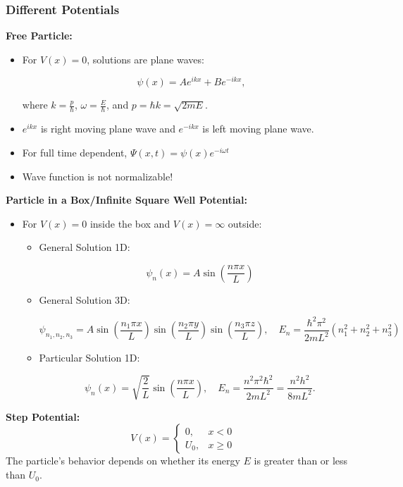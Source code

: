 \documentclass{article}
\newcommand{\eqbox}[1]{\begin{tcolorbox}[colback=gray!10] #1 \end{tcolorbox}}
\newcommand{\conceptbox}[1]{\begin{tcolorbox}[colback=blue!10] #1 \end{tcolorbox}}
\begin{document}
\subsubsection{Different Potentials}
\conceptbox{
\textbf{Free Particle:}
\begin{itemize}
    \item For \( V(x) = 0 \), solutions are plane waves:
    \eqbox{
    \[
    \psi(x) = Ae^{ikx} + Be^{-ikx},
    \]}
    where \( k = \frac{p}{\hbar} \), \( \omega = \frac{E}{\hbar} \), and \(p = \hbar k = \sqrt{2mE}\).
    \item \(e^{ikx}\) is right moving plane wave and \(e^{-ikx}\) is left moving plane wave.
    \item For full time dependent, \(\Psi(x,t) = \psi(x)e^{-i\omega t}\)
    \item Wave function is not normalizable!
\end{itemize}
}

\conceptbox{
\textbf{Particle in a Box/Infinite Square Well Potential:}
\begin{itemize}
    \item For \( V(x) = 0 \) inside the box and \( V(x) = \infty \) outside:
    \begin{itemize}
        \item General Solution 1D:
            \eqbox{
                \[
                    \psi_n(x) = A\sin\left(\frac{n\pi x}{L}\right)
                \]
            }
        \item General Solution 3D:
            \eqbox{
                \[
                \psi_{n_1, n_2, n_3} = A\sin(\frac{n_1 \pi x}{L})\sin(\frac{n_2 \pi y}{L})\sin(\frac{n_3 \pi z}{L})
                , \quad E_n = \frac{\hbar ^2 \pi^2}{2mL^2}(n_1^2 + n_2^2 + n_3^2)
                \]
            }
        \item Particular Solution 1D:
            \eqbox{
            \[
            \psi_n(x) = \sqrt{\frac{2}{L}} \sin\left(\frac{n\pi x}{L}\right), \quad E_n = \frac{n^2\pi^2\hbar^2}{2mL^2} = \frac{n^2 h^2}{8mL^2}.
            \]}
    \end{itemize}
\end{itemize}
}


\conceptbox{
\textbf{Step Potential:}
\[
V(x) = 
\begin{cases} 
0, & x < 0 \\ 
U_0, & x \geq 0 
\end{cases}
\]
The particle's behavior depends on whether its energy \( E \) is greater than or less than \( U_0 \).
}
\end{document}
